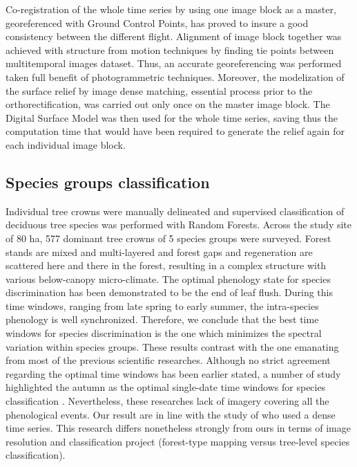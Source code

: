 \documentclass[remotesensing,article,submit,moreauthors,pdftex,12pt,a4paper]{mdpi} %
\begin{document}
Co-registration of the whole time series by using one image block as a master, georeferenced with Ground Control Points, has proved to insure a good consistency between the different flight. 
Alignment of image block together was achieved with structure from motion techniques by finding tie points between multitemporal images dataset. 
Thus, an accurate georeferencing was performed taken full benefit of photogrammetric techniques.
Moreover, the modelization of the surface relief by image dense matching, essential process prior to the orthorectification, was carried out only once on the master image block. 
The Digital Surface Model was then used for the whole time series, saving thus the computation time that would have been required to generate the relief again for each individual image block.

\subsection{Species groups classification}

Individual tree crowns were manually delineated and supervised classification of deciduous tree species was performed with Random Forests. 
Across the study site of 80 ha, 577 dominant tree crowns of 5 species groups were surveyed. 
Forest stands are mixed and multi-layered and forest gaps and regeneration are scattered here and there in the forest, resulting in a complex structure with various below-canopy micro-climate. 
The optimal phenology state for species discrimination has been demonstrated to be the end of leaf flush. 
During this time windows, ranging from late spring to early summer, the intra-species phenology is well synchronized. 
Therefore, we conclude that the best time windows for species discrimination is the one which minimizes the spectral variation within species groups. 
These results contrast with the one emanating from most of the previous scientific researches. 
Although no strict agreement regarding the optimal time windows has been earlier stated, a number of study highlighted the autumn as the optimal single-date time windows for species classification \citep{key_comparison_2001,hill_mapping_2010, somers_multi-temporal_2013}. 
Nevertheless, these researches lack of imagery covering all the phenological events.
Our result are in line with the study of \citeauthor{kempeneers_data_2011} \cite{kempeneers_data_2011} who used a dense time series.  
This research differs nonetheless strongly from ours in terms of image resolution and classification project (forest-type mapping versus tree-level species classification).
\end{document}
